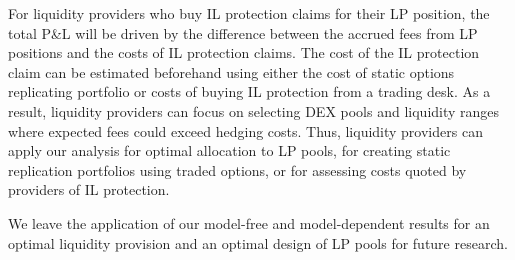 \documentclass[pdftex,11pt,a4paper] {article}
\begin{document}
For liquidity providers who buy IL protection claims for their LP position,
the total P\&L will be driven by the difference between the accrued fees from LP
positions and the costs of IL protection claims. The cost of the IL protection
claim can be estimated beforehand using either the cost of static options
replicating portfolio or costs of buying IL protection from a trading desk.
As a result, liquidity providers can focus on selecting DEX pools and
liquidity ranges where expected fees could exceed hedging costs. Thus,
liquidity providers can apply our analysis for optimal allocation to LP pools, for creating static replication portfolios using traded
options, or for assessing costs quoted by providers of IL protection.

We leave the application of our model-free and model-dependent results for an optimal liquidity provision and an optimal design of LP pools for future research.
\end{document}
